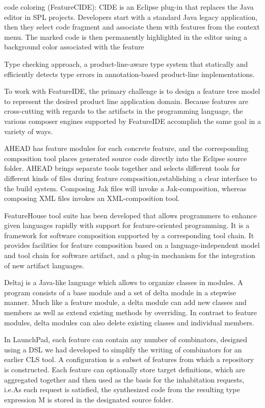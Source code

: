 code coloring (FeatureCIDE): CIDE is an Eclipse plug-in that replaces the Java editor in SPL projects. Developers
start with a standard Java legacy application, then they select code fragment and associate them with features
 from the context menu. The marked code is then permanently highlighted in the editor using a background color
 associated with the feature

Type checking approach,  a product-line-aware type system that statically and efficiently detects type errors in
annotation-based product-line implementations.


To work with FeatureIDE, the primary challenge is to design a feature tree model to represent the desired product
line application domain. Because features are cross-cutting with regards to the artifacts in the programming
language, the various composer engines supported by FeatureIDE accomplish the same goal in a variety of ways.

AHEAD has feature modules for each concrete feature, and the corresponding composition tool places generated
source code directly into the Eclipse source folder. AHEAD brings separate tools together and selects different
tools for different kinds of files during feature composition,establishing a clear interface to the build
system. Composing Jak files will invoke a Jak-composition, whereas composing XML files invokes an
XML-composition tool.

FeatureHouse tool suite has been developed that allows programmers to enhance given languages rapidly with
support for feature-oriented programming. It is a framework for software composition supported by a
corresponding tool chain. It provides facilities for feature  composition based on a language-independent
model and tool chain for software artifact, and a plug-in mechanism for the integration of new artifact
languages.

Deltaj is a Java-like language which allows to organize classes in modules. A program consists of a base
 module and a set of delta module in a stepwise manner. Much like a feature module, a delta module can add
 new classes and members as well as extend existing methods by overriding. In contrast to feature modules,
 delta modules can also delete existing classes and individual members.

In LaunchPad, each feature can contain any number of combinators, designed using a DSL we had developed to
simplify the writing of combinators for an earlier CLS tool. A configuration is a subset of features from
which a repository is constructed. Each feature can optionally store target definitions, which are aggregated
 together and then used as the basis for the inhabitation requests, i.e.As each request is satisfied, the
 synthesized code from the resulting type expression M is stored in the designated source folder.


